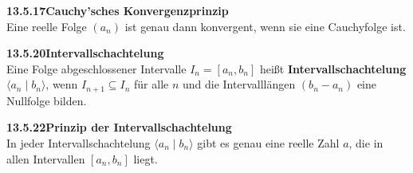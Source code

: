 \documentclass[a4paper,12pt]{article}
\newcommand{\gentry}[3]{%
  \noindent\textbf{#1\quad #2}\nopagebreak\\[0.2em]
  #3\par\smallskip
}
\begin{document}
\gentry{13.5.17}{Cauchy'sches Konvergenzprinzip}{%
  Eine reelle Folge $(a_n)$ ist genau dann konvergent, wenn sie eine Cauchyfolge ist.
}

\gentry{13.5.20}{Intervallschachtelung}{%
  Eine Folge abgeschlossener Intervalle $I_n = [a_n, b_n]$ heißt \textbf{Intervallschachtelung}
  $\langle a_n \mid b_n \rangle$, wenn $I_{n+1} \subseteq I_n$ für alle $n$ und die
  Intervalllängen $(b_n - a_n)$ eine Nullfolge bilden.
}

\gentry{13.5.22}{Prinzip der Intervallschachtelung}{%
  In jeder Intervallschachtelung $\langle a_n \mid b_n \rangle$ gibt es genau eine reelle
  Zahl $a$, die in allen Intervallen $[a_n, b_n]$ liegt.
}
\end{document}
